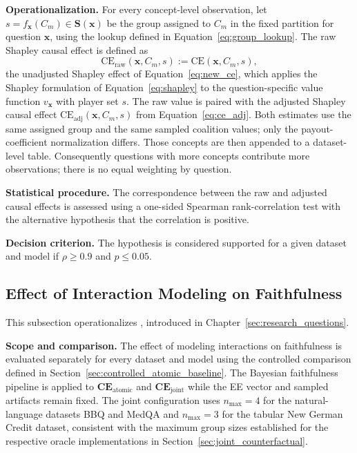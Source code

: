 \noindent\textbf{Operationalization.} For every concept-level observation, let $s=f_{\mathbf{x}}(C_m)\in\mathbf{S}(\mathbf{x})$ be the group assigned to $C_m$ in the fixed partition for question $\mathbf{x}$, using the lookup defined in Equation~\ref{eq:group_lookup}. The raw Shapley causal effect is defined as
\begin{equation}
	\mathrm{CE}_{\mathrm{raw}}(\mathbf{x},C_m,s) := \mathrm{CE}(\mathbf{x},C_m,s),
\end{equation}
the unadjusted Shapley effect of Equation~\ref{eq:new_ce}, which applies the Shapley formulation of Equation~\ref{eq:shapley} to the question-specific value function $v_{\mathbf{x}}$ with player set $s$. The raw value is paired with the adjusted Shapley causal effect $\mathrm{CE}_{\mathrm{adj}}(\mathbf{x},C_m,s)$ from Equation~\ref{eq:ce_adj}. Both estimates use the same assigned group and the same sampled coalition values; only the payout-coefficient normalization differs. Those concepts are then appended to a dataset-level table. Consequently questions with more concepts contribute more observations; there is no equal weighting by question.

\noindent\textbf{Statistical procedure.} The correspondence between the raw and adjusted causal effects is assessed using a one-sided Spearman rank-correlation test with the alternative hypothesis that the correlation is positive.

\noindent\textbf{Decision criterion.} The hypothesis is considered supported for a given dataset and model if $\rho \ge 0.9$ and $p \le 0.05$.

\subsection{Effect of Interaction Modeling on Faithfulness}
This subsection operationalizes , introduced in Chapter~\ref{sec:research_questions}.

\noindent\textbf{Scope and comparison.} The effect of modeling interactions on faithfulness is evaluated separately for every dataset and model using the controlled comparison defined in Section~\ref{sec:controlled_atomic_baseline}. The Bayesian faithfulness pipeline is applied to $\mathbf{CE}_{\mathrm{atomic}}$ and $\mathbf{CE}_{\mathrm{joint}}$ while the EE vector and sampled artifacts remain fixed. The joint configuration uses $n_{\max}=4$ for the natural-language datasets BBQ and MedQA and $n_{\max}=3$ for the tabular New German Credit dataset, consistent with the maximum group sizes established for the respective oracle implementations in Section~\ref{sec:joint_counterfactual}.


